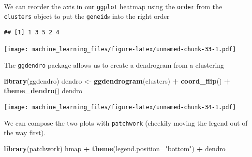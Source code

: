 \documentclass[
]{book}
\newenvironment{Shaded}{\begin{snugshade}}{\end{snugshade}}
\newcommand{\DataTypeTok}[1]{\textcolor[rgb]{0.13,0.29,0.53}{#1}}
\newcommand{\KeywordTok}[1]{\textcolor[rgb]{0.13,0.29,0.53}{\textbf{#1}}}
\newcommand{\NormalTok}[1]{#1}
\newcommand{\OperatorTok}[1]{\textcolor[rgb]{0.81,0.36,0.00}{\textbf{#1}}}
\newcommand{\StringTok}[1]{\textcolor[rgb]{0.31,0.60,0.02}{#1}}
\begin{document}
We can reorder the axis in our \texttt{ggplot} heatmap using the \texttt{order} from the \texttt{clusters} object to put the \texttt{geneid}s into the right order

\begin{Shaded}
\end{Shaded}

\begin{verbatim}
## [1] 1 3 5 2 4
\end{verbatim}

\begin{Shaded}
\end{Shaded}

\texttt{[image: machine\_learning\_files/figure-latex/unnamed-chunk-33-1.pdf]}

The \texttt{ggdendro} package allows us to create a dendrogram from a clustering

\begin{Shaded}
\begin{Highlighting}[]
\KeywordTok{library}\NormalTok{(ggdendro)}
\NormalTok{dendro <-}\StringTok{ }\KeywordTok{ggdendrogram}\NormalTok{(clusters) }\OperatorTok{+}\StringTok{ }\KeywordTok{coord_flip}\NormalTok{() }\OperatorTok{+}\StringTok{ }\KeywordTok{theme_dendro}\NormalTok{()}
\NormalTok{dendro}
\end{Highlighting}
\end{Shaded}

\texttt{[image: machine\_learning\_files/figure-latex/unnamed-chunk-34-1.pdf]}

We can compose the two plots with \texttt{patchwork} (cheekily moving the legend out of the way first).

\begin{Shaded}
\begin{Highlighting}[]
\KeywordTok{library}\NormalTok{(patchwork)}
\NormalTok{hmap }\OperatorTok{+}\StringTok{ }\KeywordTok{theme}\NormalTok{(}\DataTypeTok{legend.position=}\StringTok{"bottom"}\NormalTok{) }\OperatorTok{+}\StringTok{  }\NormalTok{dendro}
\end{Highlighting}
\end{Shaded}
\end{document}
